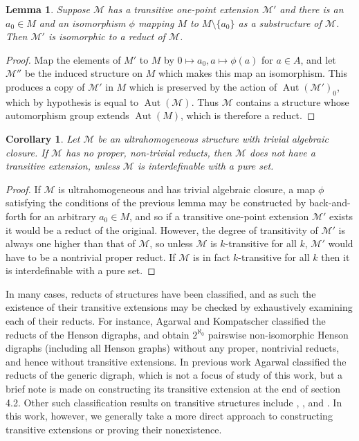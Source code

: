 \documentclass{amsart}
\newtheorem{lemma}[theorem]{Lemma}
\newtheorem{corollary}[theorem]{Corollary}
\newcommand{\set}[1]{\{#1 \}}
\newcommand{\model}{\mathcal{M}}
\DeclareMathOperator{\Aut}{Aut}
\begin{document}
\begin{lemma}\label{reducts lemma}
    Suppose $\mathcal{M}$ has a transitive one-point extension $\mathcal{M}'$ and there is an $a_0 \in M$ and an isomorphism $\phi$ mapping $M$ to $M \setminus \set{a_0}$ as a substructure of $\model$. Then $\mathcal{M}'$ is isomorphic to a reduct of $\mathcal{M}$.
\end{lemma}
\begin{proof}
    Map the elements of $M'$ to $M$ by $0 \mapsto a_0, a \mapsto\phi(a)$ for $a \in A$, and let $\mathcal{M}''$ be the induced structure on $M$ which makes this map an isomorphism. This produces a copy of $\mathcal{\model'}$ in $M$ which is preserved by the action of $\Aut(\model')_0$, which by hypothesis is equal to $\Aut(\model)$. Thus $\model$ contains a structure whose automorphism group extends $\Aut(M)$, which is therefore a reduct.
\end{proof}

\begin{corollary}\label{reducts corollary}
    Let $\model$ be an ultrahomogeneous structure with trivial algebraic closure. If $\model$ has no proper, non-trivial reducts, then $\model$ does not have a transitive extension, unless $\model$ is interdefinable with a pure set.
\end{corollary}
\begin{proof}
    If $\model$ is ultrahomogeneous and has trivial algebraic closure, a map $\phi$ satisfying the conditions of the previous lemma may be constructed by back-and-forth for an arbitrary $a_0 \in M$, and so if a transitive one-point extension $\model'$ exists it would be a reduct of the original. However, the degree of transitivity of $\model'$ is always one higher than that of $\model$, so unless $\model$ is $k$-transitive for all $k$, $\model'$ would have to be a nontrivial proper reduct. If $\model$ is in fact $k$-transitive for all $k$ then it is interdefinable with a pure set.
\end{proof}

In many cases, reducts of structures have been classified, and as such the existence of their transitive extensions may be checked by exhaustively examining each of their reducts. For instance, Agarwal and Kompatscher \cite{agarwal2018pairwise} classified the reducts of the Henson digraphs, and obtain $2^{\aleph_0}$ pairswise non-isomorphic Henson digraphs (including all Henson graphs) without any proper, nontrivial reducts, and hence without transitive extensions. In previous work Agarwal \cite{agarwal2016reducts} classified the reducts of the generic digraph, which is not a focus of study of this work, but a brief note is made on constructing its transitive extension at the end of section 4.2. Other such classification results on transitive structures include \cite{bodirsky201542}, \cite{pach2014reducts}, \cite{thomas1991reducts} and \cite{thomas1996reducts}. In this work, however, we generally take a more direct approach to constructing transitive extensions or proving their nonexistence.
\end{document}
